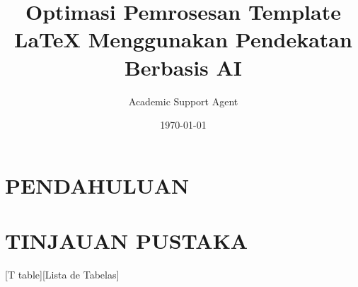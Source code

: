 \documentclass{report}
\title{Optimasi Pemrosesan Template LaTeX Menggunakan Pendekatan Berbasis AI}
\author{Academic Support Agent}
\date{\today}
\begin{document}
\maketitle

\begin{abstract}

\end{abstract}

\chapter{PENDAHULUAN}


\chapter{TINJAUAN PUSTAKA}


\usepackage[brazil]{babel}
\usepackage[latin1,utf8]{inputenc}
\usepackage[T1]{fontenc}
\usepackage{amssymb,amsmath,amsfonts}
\usepackage{textcomp}
\usepackage{graphicx}
\usepackage{wrapfig}
\usepackage{color}
\usepackage{setspace}

\usepackage[bottom=2cm,top=3cm,left=3cm,right=2cm]{geometry}

\usepackage{kantlipsum}
\allowdisplaybreaks

\usepackage[position=top]{subfig}
\graphicspath{{figuras/}{fig_site/}}

\usepackage{caption}
[T table][Lista de Tabelas]

\newcommand{\chapfnt}{\fontsize{12}{12}}
\newcommand{\secfnt}{\fontsize{12}{12}}
\makeatletter
\def\@makechapterhead#1{%
  {\parindent \z@ \raggedright \normalfont
    \ifnum \c@secnumdepth >\m@ne
        \chapfnt\bfseries %
        \thechapter \hskip 10\p@ %
    \fi
    \interlinepenalty\@M
    \chapfnt \bfseries #1\par\nobreak
    \vskip 40\p@
  }}
\renewcommand\section{\@startsection {section}{1}{\z@}%
                  {-3.5ex \@plus -1ex \@minus -.2ex}%
                  {2.3ex \@plus.2ex}%
                  {\normalfont\secfnt}}
\renewcommand\subsection{\@startsection{subsection}{2}{\z@}%
                {-3.25ex\@plus -1ex \@minus -.2ex}%
                {1.5ex \@plus.2ex}%
                {\normalfont\secfnt}}
\end{document}
